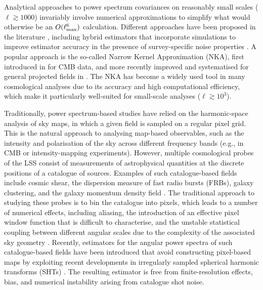 \documentclass[%
 reprint,
superscriptaddress,
nofootinbib,
 amsmath,amssymb,
 aps,
 prd,
]{revtex4-2}
\begin{document}
    Analytical approaches to power spectrum covariances on reasonably small scales ($\ell\gtrsim1000$) invariably involve numerical approximations to simplify what would otherwise be an $O(\ell_{\rm max}^6)$ calculation. Different approaches have been proposed in the literature \cite{2012.08568,2204.13721}, including hybrid estimators that incorporate simulations to improve estimator accuracy in the presence of survey-specific noise properties \cite{2412.07068}. A popular approach is the so-called Narrow Kernel Approximation (NKA), first introduced in \cite{astro-ph/0307515,astro-ph/0410394} for CMB data, and more recently improved and systematised for general projected fields in \cite{1906.11765,2010.09717}. The NKA has become a widely used tool in many cosmological analyses \cite{2304.00701,2309.05659,2410.22397,2412.07068,2510.18981} due to its accuracy and high computational efficiency, which make it particularly well-suited for small-scale analyses ($\ell\gtrsim10^3$).
    
    Traditionally, power spectrum-based studies have relied on the harmonic-space analysis of sky maps, in which a given field is sampled on a regular pixel grid. This is the natural approach to analysing map-based observables, such as the intensity and polarisation of the sky across different frequency bands (e.g., in CMB or intensity-mapping experiments). However, multiple cosmological probes of the LSS consist of measurements of astrophysical quantities at the discrete positions of a catalogue of sources. Examples of such catalogue-based fields include cosmic shear, the dispersion measure of fast radio bursts (FRBs), galaxy clustering, and the galaxy momentum density field \cite{2512.14625,2605.15947}. The traditional approach to studying these probes is to bin the catalogue into pixels, which leads to a number of numerical effects, including aliasing, the introduction of an effective pixel window function that is difficult to characterise, and the unstable statistical coupling between different angular scales due to the complexity of the associated sky geometry \citep{2025JCAP...05..048H}. Recently, estimators for the angular power spectra of such catalogue-based fields have been introduced that avoid constructing pixel-based maps \cite{2312.12285,2407.21013,2408.16903} by exploiting recent developments in irregularly sampled spherical harmonic transforms (SHTs) \cite{2304.10431}. The resulting estimator is free from finite-resolution effects, bias, and numerical instability arising from catalogue shot noise.
        
\end{document}

